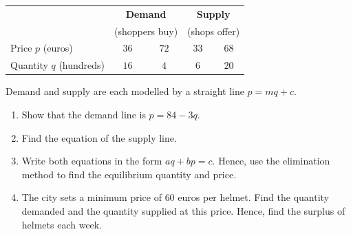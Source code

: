 \documentclass[12pt, twoside]{article}
\begin{document}
\begin{enumerate}[itemsep=0.15cm]
\begin{center}
\renewcommand{\arraystretch}{1.3}
\begin{tabular}{l|cc|cc}
  & \multicolumn{2}{c|}{\textbf{Demand}} & \multicolumn{2}{c}{\textbf{Supply}} \\
  & \multicolumn{2}{c|}{(shoppers buy)} & \multicolumn{2}{c}{(shops offer)} \\
  \hline
  Price $p$ (euros) & $36$ & $72$ & $33$ & $68$ \\
  Quantity $q$ (hundreds) & $16$ & $4$ & $6$ & $20$ \\
\end{tabular}
\end{center}

Demand and supply are each modelled by a straight line $p = mq + c$.

\begin{enumerate}[itemsep=0.1cm]
  \item Show that the demand line is $p = 84 - 3q$.
  \item Find the equation of the supply line.
  \item Write both equations in the form $aq + bp = c$. Hence, use the
  elimination method to find the equilibrium quantity and price.
  \item The city sets a minimum price of $60$ euros per helmet. Find the
  quantity demanded and the quantity supplied at this price. Hence, find
  the surplus of helmets each week.
\end{enumerate}


\end{enumerate}
\end{document}
